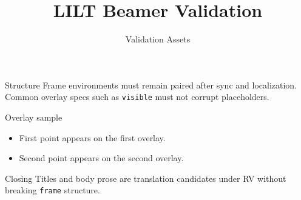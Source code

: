 \documentclass{beamer}
\title{LILT Beamer Validation}
\author{Validation Assets}
\date{}
\begin{document}
\begin{frame}
  \titlepage
\end{frame}

\begin{frame}{Structure}
\label{fr:structure}
Frame environments must remain paired after sync and localization.
Common overlay specs such as \texttt{visible} must not corrupt placeholders.
\end{frame}

\begin{frame}{Overlay sample}
  \begin{itemize}
    \item<1-> First point appears on the first overlay.
    \item<2-> Second point appears on the second overlay.
  \end{itemize}
\end{frame}

\begin{frame}{Closing}
Titles and body prose are translation candidates under RV without breaking
\texttt{frame} structure.
\end{frame}
\end{document}
